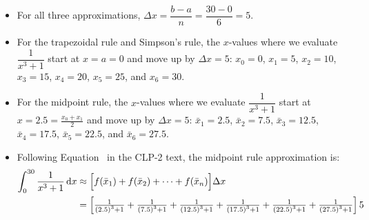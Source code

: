 \begin{solution}
\begin{itemize}
\item For all three approximations, $\Delta x = \dfrac{b-a}{n}=\dfrac{30-0}{6}=5$.


\item For the trapezoidal rule and Simpson's rule, the $x$-values where we evaluate $\dfrac{1}{x^3+1}$ start at $x=a=0$ and move up by $\Delta x = 5$:  $x_0=0$, $x_1=5$,
 $x_2=10$, $x_3=15$,
  $x_4=20$, $x_5=25$, and $x_6=30$.

  \begin{center}
  \end{center}

\item For the midpoint rule, the $x$-values where we evaluate $\dfrac{1}{x^3+1}$ start at $x=2.5 = \frac{x_0+x_1}{2}$ and move up by $\Delta x = 5$:  $\bar x_1=2.5$, $\bar x_2=7.5$,
 $\bar x_3=12.5$, $\bar x_4=17.5$,
  $\bar x_5=22.5$, and $\bar x_6=27.5$.


  \begin{center}
  \end{center}

\item  Following Equation~ in the CLP-2 text,
the midpoint rule approximation is:
\begin{align*}
\int_0^{30} \frac{1}{x^3+1}\,\mathrm{d}x&\approx\Big[f(\bar x_1)+f(\bar x_2)+\cdots
+f(\bar x_n)\Big]\Delta x\\
&=\left[\tfrac{1}{\left(2.5\right)^3+1}
+\tfrac{1}{\left(7.5\right)^3+1}
+\tfrac{1}{\left(12.5\right)^3+1}
+\tfrac{1}{\left(17.5\right)^3+1}
+\tfrac{1}{\left(22.5\right)^3+1}
+\tfrac{1}{\left(27.5\right)^3+1}
\right]5
\end{align*}


\end{itemize}
\end{solution}
